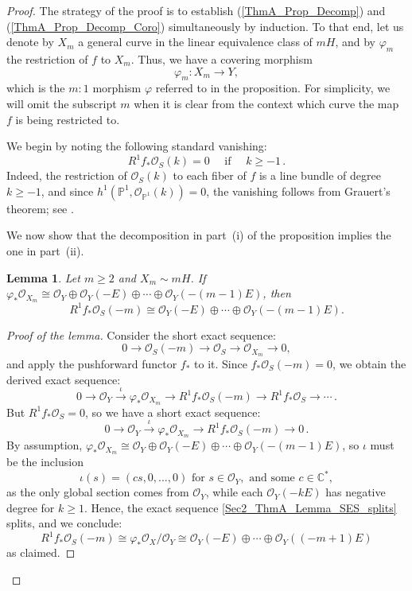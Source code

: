 \documentclass[a4paper,12pt]{amsart}
\newtheorem{lemma}[thm]{Lemma}
\begin{document}
\begin{proof}
The strategy of the proof is to establish \textnormal{(\ref{ThmA_Prop_Decomp})} and \textnormal{(\ref{ThmA_Prop_Decomp_Coro})} simultaneously by induction. To that end, let us denote by $X_m$ a general curve in the linear equivalence class of $mH$, and by $\varphi_m$ the restriction of $f$ to $X_m$. Thus, we have a covering morphism
\[
 \varphi_m : X_m \to Y,
\]
which is the $m:1$ morphism $\varphi$ referred to in the proposition. For simplicity, we will omit the subscript $m$ when it is clear from the context which curve the map $f$ is being restricted to.

We begin by noting the following standard vanishing:
\begin{equation*}
 R^1 f_{\ast} \mathcal{O}_S (k) = 0 \quad \mbox{ if } \quad k \geq -1 \, .
\end{equation*}
Indeed, the restriction of $\mathcal{O}_S (k)$ to each fiber of $f$ is a line bundle of degree $k \geq -1$, and since $h^1 (\mathbb{P}^1, \mathcal{O}_{\mathbb{P}^1} (k)) = 0$, the vanishing follows from Grauert's theorem; see \cite[Corollary~III.12.9]{Hart77}.

We now show that the decomposition in part~(i) of the proposition implies the one in part~(ii).
\begin{lemma}\label{Lemma_ThmA_(1)=>(2)}
Let $m \geq 2$ and $X_m \sim mH$. If $\varphi_{\ast} \mathcal{O}_{X_m} \cong \mathcal{O}_Y \oplus \mathcal{O}_Y (-E)  \oplus \cdots \oplus \mathcal{O}_Y (-(m-1)E)$, then
\[
R^1 f_{\ast} \mathcal{O}_S (-m) \cong \mathcal{O}_Y (-E) \oplus \cdots \oplus \mathcal{O}_Y (-(m-1)E) .
\]
\end{lemma}

\begin{proof}[Proof of the lemma]
Consider the short exact sequence:
\[
 0 \to \mathcal{O}_S (-m)  \to \mathcal{O}_S \to \mathcal{O}_{X_m} \to 0 ,
\]
and apply the pushforward functor $f_{\ast}$ to it. Since $f_{\ast} \mathcal{O}_S (-m) = 0$, we obtain the derived exact sequence:
\[
 0 \to \mathcal{O}_Y \xrightarrow{\iota} \varphi_{\ast} \mathcal{O}_{X_m} \to R^1 f_{\ast} \mathcal{O}_S (-m)  \to R^1 f_{\ast} \mathcal{O}_S \to \cdots \, .
\]
But $R^1 f_{\ast} \mathcal{O}_S = 0$, so we have a short exact sequence:
\begin{equation}
\label{Sec2_ThmA_Lemma_SES_splits}
  0 \to \mathcal{O}_Y \xrightarrow{\iota} \varphi_{\ast} \mathcal{O}_{X_m} \to R^1 f_{\ast} \mathcal{O}_S (-m)  \to 0 \, .
\end{equation}
%
By assumption, $\varphi_{\ast} \mathcal{O}_{X_m} \cong \mathcal{O}_Y \oplus \mathcal{O}_Y (-E)  \oplus \cdots \oplus \mathcal{O}_Y (-(m-1)E)$, so $\iota$ must be the inclusion
\[
 \iota (s) = (cs, 0, \ldots , 0) \mbox{ for } s \in \mathcal{O}_Y, \mbox{ and some } c \in \mathbb{C}^{\ast},
\]
as the only global section comes from $\mathcal{O}_Y$, while each $\mathcal{O}_Y (-kE)$ has negative degree for $k \geq 1$. Hence, the exact sequence \eqref{Sec2_ThmA_Lemma_SES_splits} splits, and we conclude:
\[
 R^1 f_{\ast} \mathcal{O}_S (-m) \cong \varphi_{\ast} \mathcal{O}_X / \mathcal{O}_Y \cong \mathcal{O}_Y (-E) \oplus \cdots \oplus \mathcal{O}_Y ((-m+1)E)
\]
as claimed.
\end{proof}


\end{proof}
\end{document}
